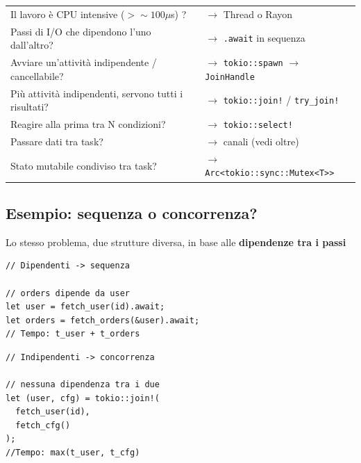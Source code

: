 \begin{table}[h!]
  \renewcommand{\arraystretch}{1.6}
  \centering
  \begin{tabularx}{\textwidth}{X X}
    \toprule
    Il lavoro è CPU intensive ($> \sim 100\mu$s) ?        & $\rightarrow$ Thread o Rayon                                          \\
    Passi di I/O che dipendono l'uno dall'altro?          & $\rightarrow$ \texttt{.await} in sequenza                             \\
    Avviare un'attività indipendente / cancellabile?      & $\rightarrow$ \texttt{tokio::spawn} $\rightarrow$ \texttt{JoinHandle} \\
    Più attività indipendenti, servono tutti i risultati? & $\rightarrow$ \texttt{tokio::join!} / \texttt{try\_join!}             \\
    Reagire alla prima tra N condizioni?                  & $\rightarrow$ \texttt{tokio::select!}                                 \\
    Passare dati tra task?                                & $\rightarrow$ canali (vedi oltre)                                     \\
    Stato mutabile condiviso tra task?                    & $\rightarrow$ \texttt{Arc<tokio::sync::Mutex<T>>}                     \\
    \bottomrule
  \end{tabularx}
\end{table}

\subsection{Esempio: sequenza o concorrenza?}
Lo stesso problema, due strutture diversa, in base alle \textbf{dipendenze tra i passi}

\begin{flushleft}
  \begin{minipage}[t]{0.45\linewidth}
    \raggedright
    \begin{verbatim}
// Dipendenti -> sequenza

// orders dipende da user
let user = fetch_user(id).await;
let orders = fetch_orders(&user).await;
// Tempo: t_user + t_orders
\end{verbatim}
  \end{minipage}%
  \hfill
  \begin{minipage}[t]{0.45\linewidth}
    \raggedright
    \begin{verbatim}
// Indipendenti -> concorrenza

// nessuna dipendenza tra i due
let (user, cfg) = tokio::join!(
  fetch_user(id),
  fetch_cfg()
);
//Tempo: max(t_user, t_cfg)
\end{verbatim}
  \end{minipage}
\end{flushleft}

